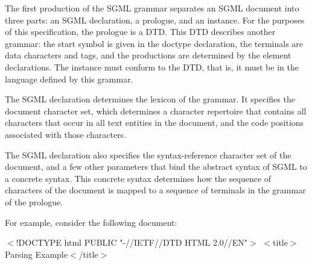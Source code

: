 The first production of the SGML grammar separates an SGML document
into three parts:  an SGML declaration, a prologue, and an
instance.  For the purposes of this specification, the prologue is a
DTD.  This DTD describes another grammar:  the start symbol is given in
the doctype declaration, the terminals are data characters and tags,
and the productions are determined by the element declarations.  The
instance must conform to the DTD, that is, it must be in the language
defined by this grammar.
\par \par 
The SGML declaration determines the lexicon of the grammar.  It
specifies the document character set, which determines a
character repertoire that contains all characters that occur in all
text entities in the document, and the code positions associated with
those characters.
\par \par 
The SGML declaration also specifies the syntax-reference character set
of the document, and a few other parameters that bind the abstract
syntax of SGML to a concrete syntax.  This concrete syntax determines
how the sequence of characters of the document is mapped to a sequence
of terminals in the grammar of the prologue.
\par \par 
For example, consider the following document:
\par $<$!DOCTYPE html PUBLIC "-//IETF//DTD HTML 2.0//EN"$>$
$<$title$>$Parsing Example$<$/title$>$
